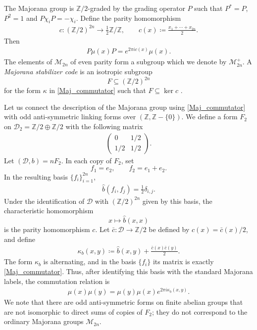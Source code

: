 \documentclass[sn-mathphys-num]{sn-jnl}
\theoremstyle{definition}
\numberwithin{equation}{section}
\theoremstyle{definition}
\def\CM {{\mathcal M}}
\def\CD {{\mathcal D}}
\def\CD {{\mathcal D}}
\def\IZ{{\mathbb{Z}}}
\def\ker{\operatorname{ker}}
\begin{document}
\begin{appendices}
The Majorana group is $\IZ/2$-graded by the grading operator $P$ such
that $P^*=P$, $P^2=1$ and $P\chi_iP=-\chi_i$. Define the parity
homomorphism
\begin{align}\label{eq:z2grading}
    c:(\IZ/2)^{2n}
    \longrightarrow
    \frac{1}{2}\IZ/\IZ,
    \qquad
    c(x)
    \coloneqq
    \frac{x_1+\cdots+x_{2n}}{2}.
\end{align}
Then
\begin{align}\label{eq:parity}
    P\mu(x)P
    =
    e^{2\pi i c(x)}\mu(x).
\end{align}
The elements of $\CM_{2n}$ of even parity form a subgroup which we
denote by $\CM_{2n}^+$. A \textit{Majorana stabilizer code} is an
isotropic subgroup
\[
    F\subseteq(\IZ/2)^{2n}
\]
for the form $\kappa$ in \eqref{Maj_commutator} such that
$F\subseteq\ker c$
\cite{Bravyi_2002,bettaque2025structuremajoranacliffordgroup}.

Let us connect the description of the Majorana group using
\eqref{Maj_commutator} with odd anti-symmetric linking forms over
$(\IZ,\IZ-\{0\})$. We define a form $F_2$ on
$\CD_2=\IZ/2\oplus\IZ/2$ with the following matrix
\begin{align}\label{eq:Fform}
    \begin{pmatrix}
        0 & 1/2\\
        1/2 & 1/2
    \end{pmatrix}.
\end{align}
Let $(\CD,b)=nF_2$. In each copy of $F_2$, set
\[
    f_1=e_2,
    \qquad
    f_2=e_1+e_2.
\]
In the resulting basis $\{f_i\}_{i=1}^{2n}$,
\begin{align}
    \hat b(f_i,f_j)
    =
    \frac{1}{2}\delta_{i,j}.
\end{align}
Under the identification of $\CD$ with $(\IZ/2)^{2n}$ given by this
basis, the characteristic homomorphism
\[
    x\longmapsto\hat b(x,x)
\]
is the parity homomorphism $c$. Let
$\bar c:\CD\to\IZ/2$ be defined by
$c(x)=\bar c(x)/2$, and define
\begin{align}
    \kappa_b(x,y)
    \coloneqq
    \hat b(x,y)
    +
    \frac{\bar c(x)\bar c(y)}{2}.
\end{align}
The form $\kappa_b$ is alternating, and in the basis $\{f_i\}$ its
matrix is exactly \eqref{Maj_commutator}. Thus, after identifying this
basis with the standard Majorana labels, the commutation relation is
\begin{align}\label{eq:modified_commutation}
    \mu(x)\mu(y)
    =
    \mu(y)\mu(x)e^{2\pi i\kappa_b(x,y)}.
\end{align}
We note that there are odd anti-symmetric forms on finite abelian
groups that are not isomorphic to direct sums of copies of $F_2$;
they do not correspond to the ordinary Majorana groups $\CM_{2n}$.

\end{appendices}

\end{document}
